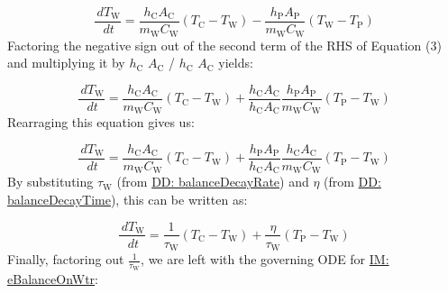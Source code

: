 \documentclass[12pt]{article}
\begin{document}
\begin{displaymath}
\frac{\,d{T_{\text{W}}}}{\,dt}=\frac{{h_{\text{C}}} {A_{\text{C}}}}{{m_{\text{W}}} {C_{\text{W}}}} \left({T_{\text{C}}}-{T_{\text{W}}}\right)-\frac{{h_{\text{P}}} {A_{\text{P}}}}{{m_{\text{W}}} {C_{\text{W}}}} \left({T_{\text{W}}}-{T_{\text{P}}}\right)
\end{displaymath}
Factoring the negative sign out of the second term of the RHS of Equation (3) and multiplying it by ${h_{\text{C}}}$ ${A_{\text{C}}}$ / ${h_{\text{C}}}$ ${A_{\text{C}}}$ yields:

\begin{displaymath}
\frac{\,d{T_{\text{W}}}}{\,dt}=\frac{{h_{\text{C}}} {A_{\text{C}}}}{{m_{\text{W}}} {C_{\text{W}}}} \left({T_{\text{C}}}-{T_{\text{W}}}\right)+\frac{{h_{\text{C}}} {A_{\text{C}}}}{{h_{\text{C}}} {A_{\text{C}}}} \frac{{h_{\text{P}}} {A_{\text{P}}}}{{m_{\text{W}}} {C_{\text{W}}}} \left({T_{\text{P}}}-{T_{\text{W}}}\right)
\end{displaymath}
Rearraging this equation gives us:

\begin{displaymath}
\frac{\,d{T_{\text{W}}}}{\,dt}=\frac{{h_{\text{C}}} {A_{\text{C}}}}{{m_{\text{W}}} {C_{\text{W}}}} \left({T_{\text{C}}}-{T_{\text{W}}}\right)+\frac{{h_{\text{P}}} {A_{\text{P}}}}{{h_{\text{C}}} {A_{\text{C}}}} \frac{{h_{\text{C}}} {A_{\text{C}}}}{{m_{\text{W}}} {C_{\text{W}}}} \left({T_{\text{P}}}-{T_{\text{W}}}\right)
\end{displaymath}
By substituting ${τ_{\text{W}}}$ (from \hyperref[DD:balanceDecayRate]{DD: balanceDecayRate}) and $η$ (from \hyperref[DD:balanceDecayTime]{DD: balanceDecayTime}), this can be written as:

\begin{displaymath}
\frac{\,d{T_{\text{W}}}}{\,dt}=\frac{1}{{τ_{\text{W}}}} \left({T_{\text{C}}}-{T_{\text{W}}}\right)+\frac{η}{{τ_{\text{W}}}} \left({T_{\text{P}}}-{T_{\text{W}}}\right)
\end{displaymath}
Finally, factoring out $\frac{1}{{τ_{\text{W}}}}$, we are left with the governing ODE for \hyperref[IM:eBalanceOnWtr]{IM: eBalanceOnWtr}:
\end{document}
